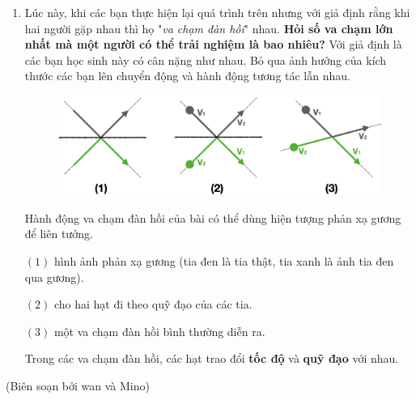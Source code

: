 \begin{enumerate}
\begin{figure}[ht]
{
}
\\
\caption{}
\label{P1.1}
\end{figure}

\item Lúc này, khi các bạn thực hiện lại quá trình trên nhưng với giả định rằng khi hai người gặp nhau thì họ "\textit{va chạm đàn hồi}" nhau. \textbf{Hỏi số va chạm lớn nhất mà một người có thể trải nghiệm là bao nhiêu?} Với giả định là các bạn học sinh này có cân nặng như nhau. Bỏ qua ảnh hưởng của kích thước các bạn lên chuyển động và hành động tương tác lẫn nhau.

\begin{figure}[ht]
    \centering
    \includegraphics[scale=0.4]{Problem_1/Image/Các trường hợp va chạm đàn hồi.png}
    \caption{}
    \label{P1.2}
\end{figure}


Hành động va chạm đàn hồi của bài có thể dùng hiện tượng phản xạ gương để liên tưởng.

$(1)$ hình ảnh phản xạ gương (tia đen là tia thật, tia xanh là ảnh tia đen qua gương). 

$(2)$ cho hai hạt đi theo quỹ đạo của các tia. 

$(3)$ một va chạm đàn hồi bình thường diễn ra.

Trong các va chạm đàn hồi, các hạt trao đổi \textbf{tốc độ} và \textbf{quỹ đạo} với nhau.
\end{enumerate}
\begin{flushright}
   \normalcolor(Biên soạn bởi wan và Mino)
\end{flushright}